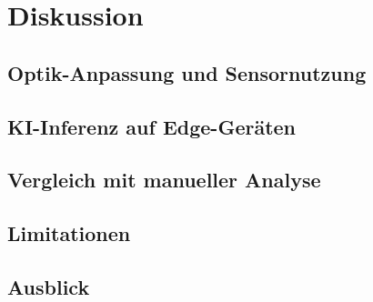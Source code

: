 \chapter{Diskussion}
\label{chap:diskussion}

\section{Optik-Anpassung und Sensornutzung}

\section{KI-Inferenz auf Edge-Geräten}

\section{Vergleich mit manueller Analyse}

\section{Limitationen}

\section{Ausblick}